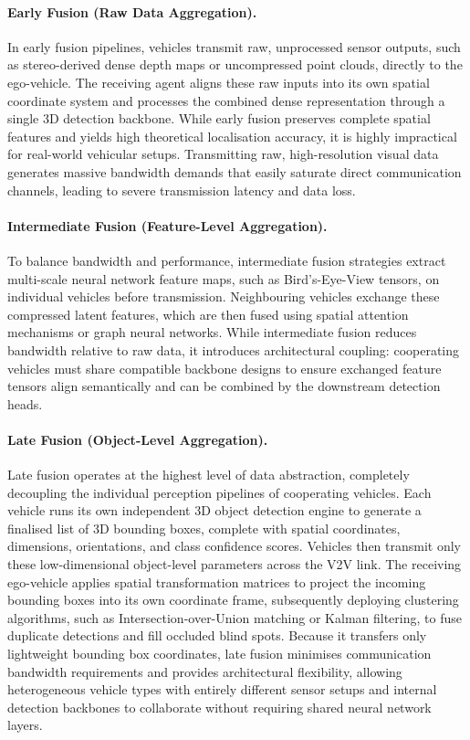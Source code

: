 \paragraph{Early Fusion (Raw Data Aggregation).}
In early fusion pipelines, vehicles transmit raw, unprocessed sensor outputs, such
as stereo-derived dense depth maps or uncompressed point clouds, directly to the
ego-vehicle. The receiving agent aligns these raw inputs into its own spatial
coordinate system and processes the combined dense representation through a single
3D detection backbone. While early fusion preserves complete spatial features and
yields high theoretical localisation accuracy, it is highly impractical for
real-world vehicular setups. Transmitting raw, high-resolution visual data
generates massive bandwidth demands that easily saturate direct communication
channels, leading to severe transmission latency and data loss.

\paragraph{Intermediate Fusion (Feature-Level Aggregation).}
To balance bandwidth and performance, intermediate fusion strategies extract
multi-scale neural network feature maps, such as Bird's-Eye-View tensors, on
individual vehicles before transmission. Neighbouring vehicles exchange these
compressed latent features, which are then fused using spatial attention
mechanisms or graph neural networks. While intermediate fusion reduces bandwidth
relative to raw data, it introduces architectural coupling: cooperating vehicles
must share compatible backbone designs to ensure exchanged feature tensors align
semantically and can be combined by the downstream detection heads.

\paragraph{Late Fusion (Object-Level Aggregation).}
Late fusion operates at the highest level of data abstraction, completely
decoupling the individual perception pipelines of cooperating vehicles. Each
vehicle runs its own independent 3D object detection engine to generate a
finalised list of 3D bounding boxes, complete with spatial coordinates,
dimensions, orientations, and class confidence scores. Vehicles then transmit only
these low-dimensional object-level parameters across the V2V link. The receiving
ego-vehicle applies spatial transformation matrices to project the incoming
bounding boxes into its own coordinate frame, subsequently deploying clustering
algorithms, such as Intersection-over-Union matching or Kalman filtering, to fuse
duplicate detections and fill occluded blind spots. Because it transfers only
lightweight bounding box coordinates, late fusion minimises communication
bandwidth requirements and provides architectural flexibility, allowing
heterogeneous vehicle types with entirely different sensor setups and internal
detection backbones to collaborate without requiring shared neural network layers.

